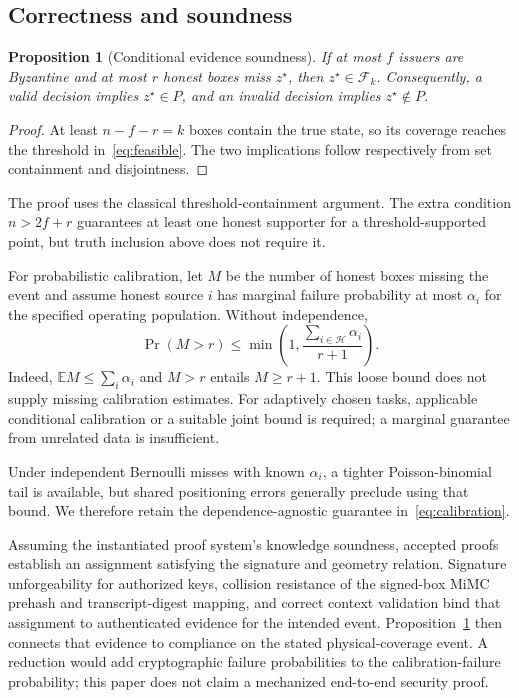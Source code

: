 \documentclass[preprint,review,12pt]{elsarticle}
\newtheorem{proposition}{Proposition}
\newcommand{\F}{\mathcal{F}_k}
\begin{document}
\subsection{Correctness and soundness}
\begin{proposition}[Conditional evidence soundness]\label{prop:soundness}
If at most $f$ issuers are Byzantine and at most $r$ honest boxes miss $z^\star$, then $z^\star\in\F$. Consequently, a valid decision implies $z^\star\in P$, and an invalid decision implies $z^\star\notin P$.
\end{proposition}
\begin{proof}
At least $n-f-r=k$ boxes contain the true state, so its coverage reaches the threshold in~\eqref{eq:feasible}. The two implications follow respectively from set containment and disjointness.\end{proof}
The proof uses the classical threshold-containment argument. The extra condition $n>2f+r$ guarantees at least one honest supporter for a threshold-supported point, but truth inclusion above does not require it.

For probabilistic calibration, let $M$ be the number of honest boxes missing the event and assume honest source $i$ has marginal failure probability at most $\alpha_i$ for the specified operating population. Without independence,
\begin{equation}\label{eq:calibration}
 \Pr(M>r)\leq \min\left(1,\frac{\sum_{i\in\mathcal H}\alpha_i}{r+1}\right).
\end{equation}
Indeed, $\mathbb{E}M\leq\sum_i\alpha_i$ and $M>r$ entails $M\geq r+1$. This loose bound does not supply missing calibration estimates. For adaptively chosen tasks, applicable conditional calibration or a suitable joint bound is required; a marginal guarantee from unrelated data is insufficient.

Under independent Bernoulli misses with known $\alpha_i$, a tighter Poisson-binomial tail is available, but shared positioning errors generally preclude using that bound. We therefore retain the dependence-agnostic guarantee in~\eqref{eq:calibration}.

Assuming the instantiated proof system's knowledge soundness, accepted proofs establish an assignment satisfying the signature and geometry relation. Signature unforgeability for authorized keys, collision resistance of the signed-box MiMC prehash and transcript-digest mapping, and correct context validation bind that assignment to authenticated evidence for the intended event. Proposition~\ref{prop:soundness} then connects that evidence to compliance on the stated physical-coverage event. A reduction would add cryptographic failure probabilities to the calibration-failure probability; this paper does not claim a mechanized end-to-end security proof.
\end{document}
